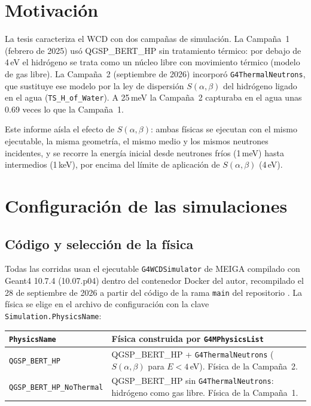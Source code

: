 \documentclass[11pt,a4paper]{article}
\newcommand{\archivo}[1]{\path{#1}}
\newcommand{\var}[1]{\texttt{#1}}
\newcommand{\sab}{$S(\alpha,\beta)$}
\begin{document}
\tableofcontents
\newpage

\section{Motivación}

La tesis caracteriza el WCD con dos campañas de simulación. La Campaña~1 (febrero de 2025) usó QGSP\_BERT\_HP sin tratamiento térmico: por debajo de 4\,eV el hidrógeno se trata como un núcleo libre con movimiento térmico (modelo de gas libre). La Campaña~2 (septiembre de 2026) incorporó \var{G4ThermalNeutrons}, que sustituye ese modelo por la ley de dispersión \sab{} del hidrógeno ligado en el agua (\var{TS\_H\_of\_Water}). A 25\,meV la Campaña~2 capturaba en el agua unas 0.69 veces lo que la Campaña~1.

Este informe aísla el efecto de \sab{}: ambas físicas se ejecutan con el mismo ejecutable, la misma geometría, el mismo medio y los mismos neutrones incidentes, y se recorre la energía inicial desde neutrones fríos (1\,meV) hasta intermedios (1\,keV), por encima del límite de aplicación de \sab{} (4\,eV).

\section{Configuración de las simulaciones}

\subsection{Código y selección de la física}

Todas las corridas usan el ejecutable \var{G4WCDSimulator} de MEIGA compilado con Geant4 10.7.4 (10.07.p04) dentro del contenedor Docker del autor, recompilado el 28 de septiembre de 2026 a partir del código de la rama \var{main} del repositorio \archivo{wcd-nacl-crns-simulations}. La física se elige en el archivo de configuración con la clave \var{Simulation.PhysicsName}:

\begin{table}[H]
\centering
\small
\begin{tabularx}{\linewidth}{lX}
\toprule
\var{PhysicsName} & Física construida por \var{G4MPhysicsList} \\
\midrule
\var{QGSP\_BERT\_HP} & QGSP\_BERT\_HP + \var{G4ThermalNeutrons} (\sab{} para $E<4$\,eV). Física de la Campaña~2. \\
\var{QGSP\_BERT\_HP\_NoThermal} & QGSP\_BERT\_HP sin \var{G4ThermalNeutrons}: hidrógeno como gas libre. Física de la Campaña~1. \\
\bottomrule
\end{tabularx}
\end{table}
\end{document}

